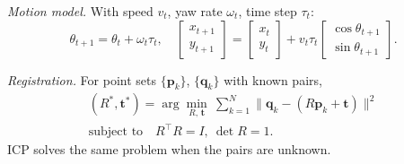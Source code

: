 \documentclass[letterpaper, 10pt, conference]{ieeeconf}
\newcommand{\p}{\mathbf{p}}
\newcommand{\q}{\mathbf{q}}
\newcommand{\tb}{\mathbf{t}}
\begin{document}
\emph{Motion model.} With speed $v_t$, yaw rate $\omega_t$, time step $\tau_t$:
\begin{equation}
\theta_{t+1}=\theta_t+\omega_t\tau_t,\quad
\begin{bmatrix}x_{t+1}\\y_{t+1}\end{bmatrix}=\begin{bmatrix}x_t\\y_t\end{bmatrix}+v_t\tau_t\begin{bmatrix}\cos\theta_{t+1}\\\sin\theta_{t+1}\end{bmatrix}.
\label{eq:motion}
\end{equation}

\emph{Registration.} For point sets $\{\p_k\}$, $\{\q_k\}$ with known pairs,
\begin{equation}
\begin{gathered}
(R^*,\tb^*)=\arg\min_{R,\,\tb}\ \sum_{k=1}^{N} \lVert \q_k-(R\p_k+\tb)\rVert^2\\
\text{subject to}\quad R^\top R=I,\ \det R=1.
\end{gathered}
\label{eq:registration}
\end{equation}
ICP solves the same problem when the pairs are unknown.
\end{document}

